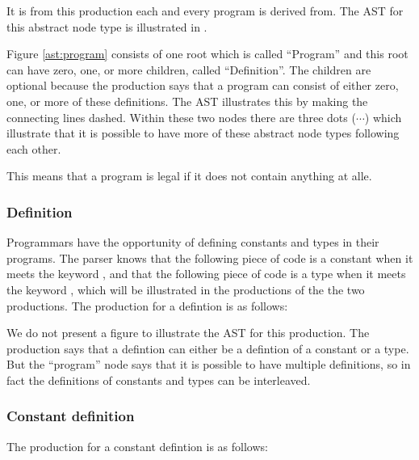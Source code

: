 \begin{ebnf}%
\end{ebnf}%

It is from this production each and every program is derived from. The AST for this abstract node type is illustrated in .%

%

Figure \ref{ast:program} consists of one root which is called ``Program'' and this root can have zero, one, or more children, called ``Definition''. The children are optional because the production says that a program can consist of either zero, one, or more of these definitions. The AST illustrates this by making the connecting lines dashed. Within these two nodes there are three dots ($\cdots$) which illustrate that it is possible to have more of these abstract node types following each other.%

This means that a program is legal if it does not contain anything at alle.

\subsubsection{Definition}%
Programmars have the opportunity of defining constants and types in their programs. The parser knows that the following piece of code is a constant when it meets the keyword , and that the following piece of code is a type when it meets the keyword , which will be illustrated in the productions of the the two productions. The production for a defintion is as follows:

\begin{ebnf}%
\end{ebnf}%


We do not present a figure to illustrate the AST for this production.
The production says that a defintion can either be a defintion of a constant or a type. But the ``program'' node says that it is possible to have multiple definitions, so in fact the definitions of constants and types can be interleaved.

\subsubsection{Constant definition}%
The production for a constant defintion is as follows:

